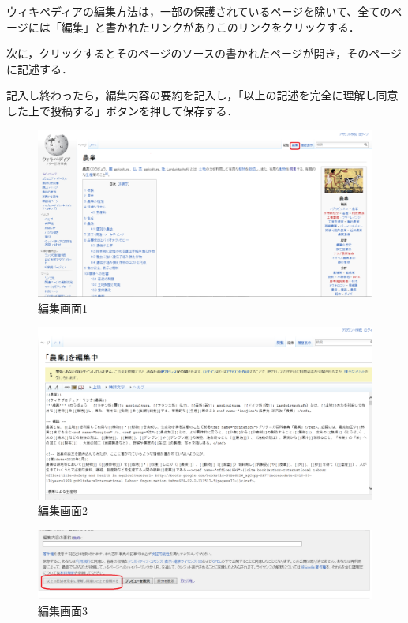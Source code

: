 ウィキペディアの編集方法は，一部の保護されているページを除いて、全てのページには「編集」と書かれたリンクがありこのリンクをクリックする．


次に，クリックするとそのページのソースの書かれたページが開き，そのページに記述する．

記入し終わったら，編集内容の要約を記入し，「以上の記述を完全に理解し同意した上で投稿する」ボタンを押して保存する．
\begin{figure}[htb]
\centering
\includegraphics[width=15cm]{mudai.png}
\caption{編集画面1}\label{図}
\end{figure}

\begin{figure}[htb]
\centering
\includegraphics[width=15cm]{2.png}
\caption{編集画面2}\label{図}
\end{figure}

\begin{figure}[htb]
\centering
\includegraphics[width=15cm]{3.png}
\caption{編集画面3}\label{図}
\end{figure}

